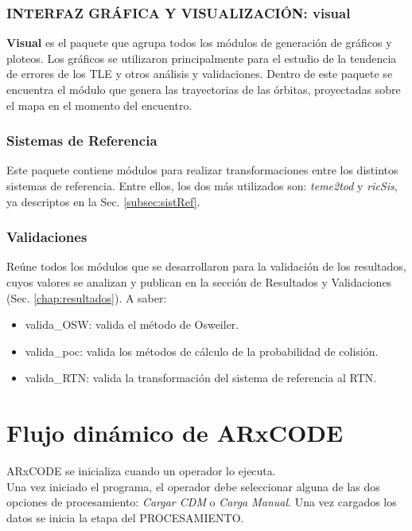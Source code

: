 \subsubsection*{INTERFAZ GR\'AFICA Y VISUALIZACI\'ON: visual}
{\bf{Visual}} es el paquete que agrupa todos los m\'odulos de generaci\'on de gr\'aficos y ploteos. Los gr\'aficos se utilizaron principalmente para el estudio de la tendencia de errores de los TLE y otros an\'alisis y validaciones.
Dentro de este paquete se encuentra el m\'odulo que genera las trayectorias de las \'orbitas, proyectadas sobre el mapa en el momento del encuentro.\\

\subsubsection*{Sistemas de Referencia}
Este paquete contiene m\'odulos para realizar transformaciones entre los distintos sistemas de referencia. Entre ellos, los dos m\'as utilizados son:
{\it{teme2tod}} y {\it{ricSis}}, ya descriptos en la Sec. \ref{subsec:sistRef}.

\subsubsection*{Validaciones}
Re\'une todos los m\'odulos que se desarrollaron para la validaci\'on de los resultados, cuyos valores se analizan y publican en la secci\'on de Resultados y Validaciones (Sec. \ref{chap:resultados}). A saber:

\begin{itemize}
 \item valida\_OSW: valida el m\'etodo de Osweiler.
 \item valida\_poc: valida los m\'etodos de c\'alculo de la probabilidad de colisi\'on.
 \item valida\_RTN: valida la transformaci\'on del sistema de referencia al RTN.
\end{itemize}


\section{Flujo din\'amico de ARxCODE}

ARxCODE se inicializa cuando un operador lo ejecuta.\\
Una vez iniciado el programa, el operador debe seleccionar alguna de las dos opciones de procesamiento: {\it{Cargar CDM}} o {\it{Carga Manual}}. Una vez cargados los datos se inicia la etapa del PROCESAMIENTO.\\

